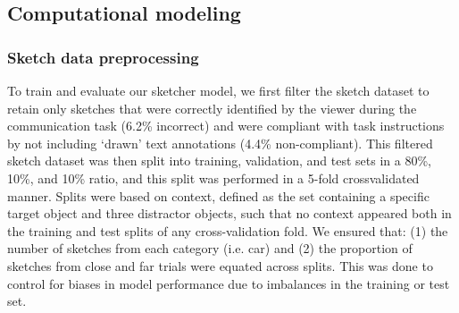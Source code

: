 \documentclass{svjour3}
\begin{document}

\subsection*{Computational modeling}



\subsubsection*{Sketch data preprocessing} 
To train and evaluate our sketcher model, we first filter the sketch dataset to retain only sketches that were correctly identified by the viewer during the communication task (6.2\% incorrect) and were compliant with task instructions by not including `drawn' text annotations (4.4\% non-compliant). 
This filtered sketch dataset was then split into training, validation, and test sets in a 80\%, 10\%, and 10\% ratio, and this split was performed in a 5-fold crossvalidated manner.
Splits were based on context, defined as the set containing a specific target object and three distractor objects, such that no context appeared both in the training and test splits of any cross-validation fold. 
We ensured that: (1) the number of sketches from each category (i.e. car) and (2) the proportion of sketches from close and far trials were equated across splits. 
This was done to control for biases in model performance due to imbalances in the training or test set.
\end{document}
